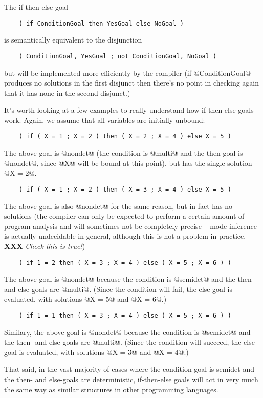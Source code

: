 \documentclass[a4paper,11pt,notitlepage,onecolumn]{article}
\newcommand{\XXX}[1]%
{{\small\textbf{XXX} \emph{#1}}}
\begin{document}
The if-then-else goal
\begin{verbatim}
    ( if ConditionGoal then YesGoal else NoGoal )
\end{verbatim}
is semantically equivalent to the disjunction
\begin{verbatim}
    ( ConditionGoal, YesGoal ; not ConditionGoal, NoGoal )
\end{verbatim}
but will be implemented more efficiently by the compiler (if
@ConditionGoal@ produces no solutions in the first disjunct then
there's no point in checking again that it has none in the
second disjunct.)

It's worth looking at a few examples to really understand how
if-then-else goals work.  Again, we assume that all variables
are initially unbound:
\begin{verbatim}
    ( if ( X = 1 ; X = 2 ) then ( X = 2 ; X = 4 ) else X = 5 )
\end{verbatim}
The above goal is @nondet@ (the condition is @multi@
and the then-goal is @nondet@, since @X@ will be bound at this point),
but has the single solution @X = 2@.
\begin{verbatim}
    ( if ( X = 1 ; X = 2 ) then ( X = 3 ; X = 4 ) else X = 5 )
\end{verbatim}
The above goal is also @nondet@ for the same reason, but in fact has no
solutions (the compiler can only be expected to perform a certain amount
of program analysis and will sometimes not be completely precise --
mode inference is actually undecidable in general, although this is not
a problem in practice.  \XXX{Check this is true!})
\begin{verbatim}
    ( if 1 = 2 then ( X = 3 ; X = 4 ) else ( X = 5 ; X = 6 ) )
\end{verbatim}
The above goal is @nondet@ because the condition is @semidet@ and the
then- and else-goals are
@multi@.  (Since the condition will fail, the
else-goal is evaluated, with solutions @X = 5@ and @X = 6@.)
\begin{verbatim}
    ( if 1 = 1 then ( X = 3 ; X = 4 ) else ( X = 5 ; X = 6 ) )
\end{verbatim}
Similary, the above goal is @nondet@ because the condition is @semidet@
and the then- and else-goals are
@multi@.  (Since the condition will succeed, the
else-goal is evaluated, with solutions @X = 3@ and @X = 4@.)

That said, in the vast majority of cases where the
condition-goal is semidet and the then- and else-goals are
deterministic, if-then-else goals will act in very much the
same way as similar structures in other programming languages.
\end{document}
